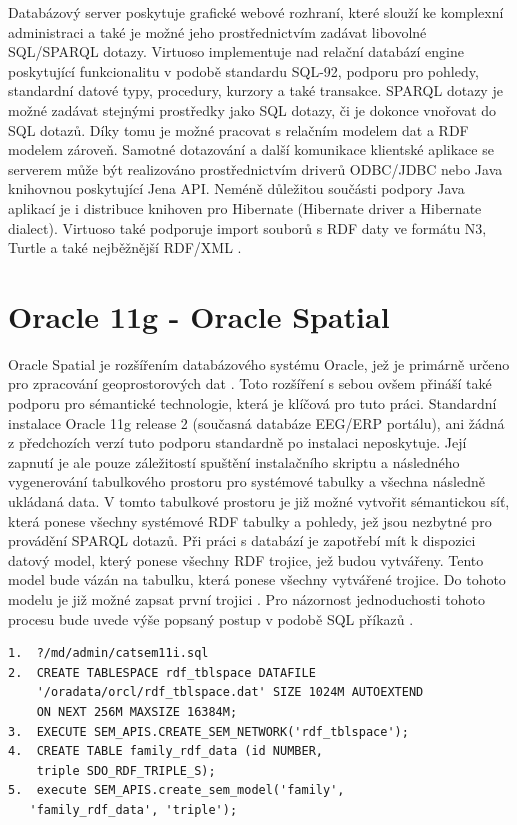 \documentclass{projekt}
\begin{document}
Databázový server poskytuje grafické webové rozhraní, které slouží ke komplexní administraci a také je možné jeho prostřednictvím zadávat libovolné SQL/SPARQL dotazy. Virtuoso implementuje nad relační databází engine poskytující funkcionalitu v podobě standardu SQL-92, podporu pro pohledy, standardní datové typy, procedury, kurzory a také transakce. SPARQL dotazy je možné zadávat stejnými prostředky jako SQL dotazy, či je dokonce vnořovat do SQL dotazů. Díky tomu je možné pracovat s relačním modelem dat a RDF modelem zároveň. Samotné dotazování a další komunikace klientské aplikace se serverem může být realizováno prostřednictvím driverů ODBC/JDBC nebo Java knihovnou poskytující Jena API. Neméně důležitou součásti podpory Java aplikací je i distribuce knihoven pro Hibernate (Hibernate driver a Hibernate dialect). Virtuoso také podporuje import souborů s RDF daty ve formátu N3, Turtle a také nejběžnější RDF/XML \cite{_24}.


\section{Oracle 11g - Oracle Spatial}
\hspace{0.65cm}Oracle Spatial je rozšířením databázového systému Oracle, jež je primárně určeno pro zpracování geoprostorových dat \cite{_25}. Toto rozšíření s sebou ovšem přináší také podporu pro sémantické technologie, která je klíčová pro tuto práci. Standardní instalace Oracle 11g release 2 (současná databáze EEG/ERP portálu), ani žádná z předchozích verzí tuto podporu standardně po instalaci neposkytuje. Její zapnutí je ale pouze záležitostí spuštění instalačního skriptu a následného vygenerování tabulkového prostoru pro systémové tabulky a všechna následně ukládaná data. V tomto tabulkové prostoru je již možné vytvořit sémantickou síť, která ponese všechny systémové RDF tabulky a pohledy, jež jsou nezbytné pro provádění SPARQL dotazů. Při práci s databází je zapotřebí mít k dispozici datový model, který ponese všechny RDF trojice, jež budou vytvářeny. Tento model bude vázán na tabulku, která ponese všechny vytvářené trojice. Do tohoto modelu je již možné zapsat první trojici \cite{_26}.
Pro názornost jednoduchosti tohoto procesu bude uvede výše popsaný postup v podobě SQL příkazů \cite{_26}. 

\begin{verbatim}
1.  ?/md/admin/catsem11i.sql
2.  CREATE TABLESPACE rdf_tblspace DATAFILE 
    '/oradata/orcl/rdf_tblspace.dat' SIZE 1024M AUTOEXTEND 
    ON NEXT 256M MAXSIZE 16384M;
3.  EXECUTE SEM_APIS.CREATE_SEM_NETWORK('rdf_tblspace');
4.  CREATE TABLE family_rdf_data (id NUMBER, 
    triple SDO_RDF_TRIPLE_S);
5.  execute SEM_APIS.create_sem_model('family', 
   'family_rdf_data', 'triple');
\end{verbatim}
\end{document}
